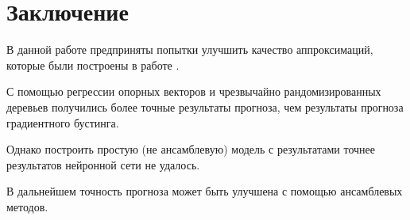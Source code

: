 \chapter*{Заключение} \label{ch-conclusion}

В данной работе предприняты попытки улучшить качество аппроксимаций, которые были построены в работе \cite{muravtsev:metamodel}.

С помощью регрессии опорных векторов и чрезвычайно рандомизированных деревьев получились более точные результаты прогноза, чем результаты прогноза градиентного бустинга.

Однако построить простую (не ансамблевую) модель с результатами точнее результатов нейронной сети не удалось.

В дальнейшем точность прогноза может быть улучшена с помощью ансамблевых методов.
